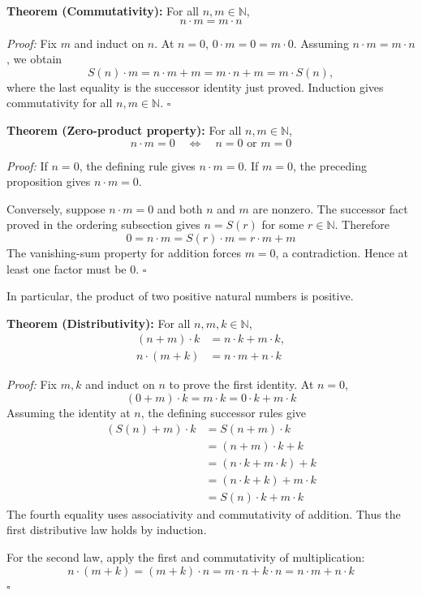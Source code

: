 \documentclass[a4paper,11pt,abstracton]{scrartcl}
\newcommand{\NN}{\mathbb{N}}
\theoremstyle{dotlessP}
\theoremstyle{dotlessS}
\theoremstyle{remark}
\theoremstyle{definition}
\begin{document}
\begin{problem_box}
\textbf{Theorem (Commutativity):}
For all $n,m\in\NN$,
\[
    n\cdot m=m\cdot n
\]
\end{problem_box}

\begin{claim_box}
\textit{Proof:}
Fix $m$ and induct on $n$. At $n=0$,
$0\cdot m=0=m\cdot0$. Assuming $n\cdot m=m\cdot n$, we obtain
\[
    S(n)\cdot m=n\cdot m+m=m\cdot n+m=m\cdot S(n),
\]
where the last equality is the successor identity just proved.
Induction gives commutativity for all $n,m\in\NN$.
\hfill$\square$
\end{claim_box}

\begin{problem_box}
\textbf{Theorem (Zero-product property):}
For all $n,m\in\NN$,
\[
    n\cdot m=0\quad\Longleftrightarrow\quad n=0\text{ or }m=0
\]
\end{problem_box}

\begin{claim_box}
\textit{Proof:}
If $n=0$, the defining rule gives $n\cdot m=0$. If $m=0$, the preceding
proposition gives $n\cdot m=0$.

Conversely, suppose $n\cdot m=0$ and both $n$ and $m$ are nonzero.
The successor fact proved in the ordering subsection gives $n=S(r)$
for some $r\in\NN$. Therefore
\[
    0=n\cdot m=S(r)\cdot m=r\cdot m+m
\]
The vanishing-sum property for addition forces $m=0$, a contradiction.
Hence at least one factor must be $0$.
\hfill$\square$
\end{claim_box}

In particular, the product of two positive natural numbers is positive.

\begin{problem_box}
\textbf{Theorem (Distributivity):}
For all $n,m,k\in\NN$,
\[
\begin{aligned}
    (n+m)\cdot k&=n\cdot k+m\cdot k,\\
    n\cdot(m+k)&=n\cdot m+n\cdot k
\end{aligned}
\]
\end{problem_box}

\begin{claim_box}
\textit{Proof:}
Fix $m,k$ and induct on $n$ to prove the first identity. At $n=0$,
\[
    (0+m)\cdot k=m\cdot k=0\cdot k+m\cdot k
\]
Assuming the identity at $n$, the defining successor rules give
\[
\begin{aligned}
    (S(n)+m)\cdot k
    &=S(n+m)\cdot k\\
    &=(n+m)\cdot k+k\\
    &=(n\cdot k+m\cdot k)+k\\
    &=(n\cdot k+k)+m\cdot k\\
    &=S(n)\cdot k+m\cdot k
\end{aligned}
\]
The fourth equality uses associativity and commutativity of addition.
Thus the first distributive law holds by induction.

For the second law, apply the first and commutativity of multiplication:
\[
    n\cdot(m+k)=(m+k)\cdot n
    =m\cdot n+k\cdot n=n\cdot m+n\cdot k
\]
\hfill$\square$
\end{claim_box}
\end{document}
